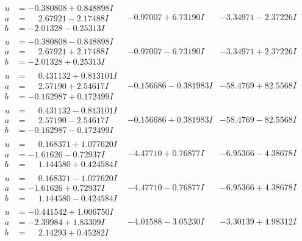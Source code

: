 \documentclass[1p]{elsarticle_modified}
\theoremstyle{definition}
\begin{document}
$$\begin{array}{c|c|c}
\begin{aligned}
u &= -0.380808 + 0.848898 I \\
a &= \phantom{-}2.67921 - 2.17488 I \\
b &= -2.01328 - 0.25313 I\end{aligned}
 & -0.97007 + 6.73190 I & -3.34971 - 2.37226 I \\ \hline\begin{aligned}
u &= -0.380808 - 0.848898 I \\
a &= \phantom{-}2.67921 + 2.17488 I \\
b &= -2.01328 + 0.25313 I\end{aligned}
 & -0.97007 - 6.73190 I & -3.34971 + 2.37226 I \\ \hline\begin{aligned}
u &= \phantom{-}0.431132 + 0.813101 I \\
a &= \phantom{-}2.57190 + 2.54617 I \\
b &= -0.162987 + 0.172499 I\end{aligned}
 & -0.156686 - 0.381983 I & -58.4769 + 82.5568 I \\ \hline\begin{aligned}
u &= \phantom{-}0.431132 - 0.813101 I \\
a &= \phantom{-}2.57190 - 2.54617 I \\
b &= -0.162987 - 0.172499 I\end{aligned}
 & -0.156686 + 0.381983 I & -58.4769 - 82.5568 I \\ \hline\begin{aligned}
u &= \phantom{-}0.168371 + 1.077620 I \\
a &= -1.61626 - 0.72937 I \\
b &= \phantom{-}1.144580 + 0.424584 I\end{aligned}
 & -4.47710 + 0.76877 I & -6.95366 - 4.38678 I \\ \hline\begin{aligned}
u &= \phantom{-}0.168371 - 1.077620 I \\
a &= -1.61626 + 0.72937 I \\
b &= \phantom{-}1.144580 - 0.424584 I\end{aligned}
 & -4.47710 - 0.76877 I & -6.95366 + 4.38678 I \\ \hline\begin{aligned}
u &= -0.441542 + 1.006750 I \\
a &= -2.39984 + 1.83309 I \\
b &= \phantom{-}2.14293 + 0.45282 I\end{aligned}
 & -4.01588 - 3.05230 I & -3.30139 + 4.98312 I \\ \hline\begin{aligned}

\end{aligned}
\end{array}$$
\end{document}

